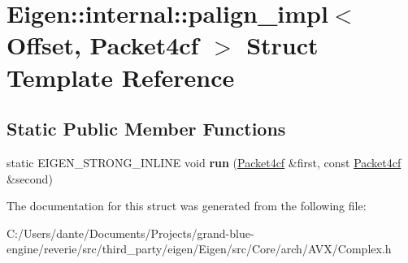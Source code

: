\hypertarget{struct_eigen_1_1internal_1_1palign__impl_3_01_offset_00_01_packet4cf_01_4}{}\section{Eigen\+::internal\+::palign\+\_\+impl$<$ Offset, Packet4cf $>$ Struct Template Reference}
\label{struct_eigen_1_1internal_1_1palign__impl_3_01_offset_00_01_packet4cf_01_4}
\subsection*{Static Public Member Functions}
\begin{DoxyCompactItemize}
\item 
\mbox{\label{struct_eigen_1_1internal_1_1palign__impl_3_01_offset_00_01_packet4cf_01_4_a143a8ec4ae04105d432ff7d5a294fb57}} 
static E\+I\+G\+E\+N\+\_\+\+S\+T\+R\+O\+N\+G\+\_\+\+I\+N\+L\+I\+NE void {\bfseries run} (\mbox{\hyperlink{struct_eigen_1_1internal_1_1_packet4cf}{Packet4cf}} \&first, const \mbox{\hyperlink{struct_eigen_1_1internal_1_1_packet4cf}{Packet4cf}} \&second)
\end{DoxyCompactItemize}


The documentation for this struct was generated from the following file\+:\begin{DoxyCompactItemize}
\item 
C\+:/\+Users/dante/\+Documents/\+Projects/grand-\/blue-\/engine/reverie/src/third\+\_\+party/eigen/\+Eigen/src/\+Core/arch/\+A\+V\+X/Complex.\+h\end{DoxyCompactItemize}
